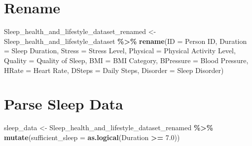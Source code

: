 \documentclass[
  11pt,
]{article}
\newenvironment{Shaded}{\begin{snugshade}}{\end{snugshade}}
\newcommand{\AttributeTok}[1]{\textcolor[rgb]{0.13,0.29,0.53}{#1}}
\newcommand{\FloatTok}[1]{\textcolor[rgb]{0.00,0.00,0.81}{#1}}
\newcommand{\FunctionTok}[1]{\textcolor[rgb]{0.13,0.29,0.53}{\textbf{#1}}}
\newcommand{\NormalTok}[1]{#1}
\newcommand{\OtherTok}[1]{\textcolor[rgb]{0.56,0.35,0.01}{#1}}
\newcommand{\SpecialCharTok}[1]{\textcolor[rgb]{0.81,0.36,0.00}{\textbf{#1}}}
\newcommand{\StringTok}[1]{\textcolor[rgb]{0.31,0.60,0.02}{#1}}
\begin{document}
\hypertarget{rename}{%
\section{Rename}\label{rename}}

\begin{Shaded}
\begin{Highlighting}[]
\NormalTok{Sleep\_health\_and\_lifestyle\_dataset\_renamed }\OtherTok{\textless{}{-}}\NormalTok{ Sleep\_health\_and\_lifestyle\_dataset }\SpecialCharTok{\%\textgreater{}\%}
  \FunctionTok{rename}\NormalTok{(}\AttributeTok{ID =} \StringTok{\textquotesingle{}Person ID\textquotesingle{}}\NormalTok{,}
         \AttributeTok{Duration =} \StringTok{\textquotesingle{}Sleep Duration\textquotesingle{}}\NormalTok{,}
         \AttributeTok{Stress =} \StringTok{\textquotesingle{}Stress Level\textquotesingle{}}\NormalTok{,}
         \AttributeTok{Physical =} \StringTok{\textquotesingle{}Physical Activity Level\textquotesingle{}}\NormalTok{,}
         \AttributeTok{Quality =} \StringTok{\textquotesingle{}Quality of Sleep\textquotesingle{}}\NormalTok{,}
         \AttributeTok{BMI =} \StringTok{\textquotesingle{}BMI Category\textquotesingle{}}\NormalTok{,}
         \AttributeTok{BPressure =} \StringTok{\textquotesingle{}Blood Pressure\textquotesingle{}}\NormalTok{,}
         \AttributeTok{HRate =} \StringTok{\textquotesingle{}Heart Rate\textquotesingle{}}\NormalTok{,}
         \AttributeTok{DSteps =} \StringTok{\textquotesingle{}Daily Steps\textquotesingle{}}\NormalTok{,}
         \AttributeTok{Disorder =} \StringTok{\textquotesingle{}Sleep Disorder\textquotesingle{}}\NormalTok{)}
\end{Highlighting}
\end{Shaded}

\hypertarget{parse-sleep-data}{%
\section{Parse Sleep Data}\label{parse-sleep-data}}

\begin{Shaded}
\begin{Highlighting}[]
\NormalTok{sleep\_data }\OtherTok{\textless{}{-}}\NormalTok{ Sleep\_health\_and\_lifestyle\_dataset\_renamed }\SpecialCharTok{\%\textgreater{}\%}
    \FunctionTok{mutate}\NormalTok{(}\AttributeTok{sufficient\_sleep =} \FunctionTok{as.logical}\NormalTok{(Duration }\SpecialCharTok{\textgreater{}=} \FloatTok{7.0}\NormalTok{))}
\end{Highlighting}
\end{Shaded}
\end{document}
